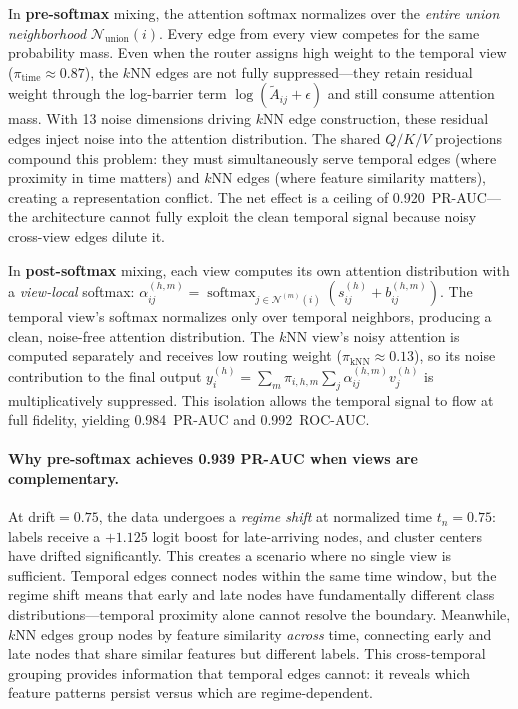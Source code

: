 \documentclass[11pt,a4paper]{article}
\newcommand{\calN}{\mathcal{N}}
\DeclareMathOperator{\softmax}{softmax}
\begin{document}
In \textbf{pre-softmax} mixing, the attention softmax normalizes over
the \emph{entire union neighborhood} $\calN_{\mathrm{union}}(i)$.
Every edge from every view competes for the same probability mass.
Even when the router assigns high weight to the temporal view
($\pi_{\text{time}} \approx 0.87$), the $k$NN edges are not fully
suppressed---they retain residual weight through the log-barrier term
$\log(\tilde{A}_{ij} + \epsilon)$ and still consume attention mass.
With 13 noise dimensions driving $k$NN edge construction, these
residual edges inject noise into the attention distribution.
The shared $Q/K/V$ projections compound this problem: they must
simultaneously serve temporal edges (where proximity in time matters)
and $k$NN edges (where feature similarity matters), creating a
representation conflict.
The net effect is a ceiling of 0.920~PR-AUC---the architecture cannot
fully exploit the clean temporal signal because noisy cross-view edges
dilute it.

In \textbf{post-softmax} mixing, each view computes its own attention
distribution with a \emph{view-local} softmax:
$\alpha_{ij}^{(h,m)} = \softmax_{j \in \calN^{(m)}(i)}(s_{ij}^{(h)} +
b_{ij}^{(h,m)})$.
The temporal view's softmax normalizes only over temporal neighbors,
producing a clean, noise-free attention distribution.
The $k$NN view's noisy attention is computed separately and receives
low routing weight ($\pi_{\text{kNN}} \approx 0.13$), so its noise
contribution to the final output
$y_i^{(h)} = \sum_m \pi_{i,h,m} \sum_j \alpha_{ij}^{(h,m)} v_j^{(h)}$
is multiplicatively suppressed.
This isolation allows the temporal signal to flow at full fidelity,
yielding 0.984~PR-AUC and 0.992~ROC-AUC.

\paragraph{Why pre-softmax achieves 0.939 PR-AUC when views are
complementary.}
At drift${} = 0.75$, the data undergoes a \emph{regime shift} at
normalized time $t_n = 0.75$: labels receive a $+1.125$ logit boost
for late-arriving nodes, and cluster centers have drifted significantly.
This creates a scenario where no single view is sufficient.
Temporal edges connect nodes within the same time window, but the regime
shift means that early and late nodes have fundamentally different
class distributions---temporal proximity alone cannot resolve the
boundary.
Meanwhile, $k$NN edges group nodes by feature similarity \emph{across}
time, connecting early and late nodes that share similar features but
different labels.
This cross-temporal grouping provides information that temporal edges
cannot: it reveals which feature patterns persist versus which are
regime-dependent.
\end{document}
